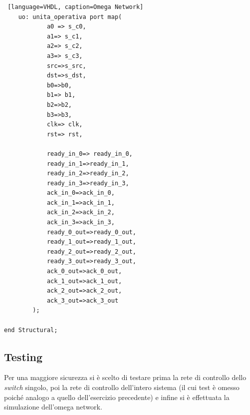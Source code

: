 \begin{lstlisting} [language=VHDL, caption=Omega Network]
    uo: unita_operativa port map(
            a0 => s_c0,
            a1=> s_c1,
            a2=> s_c2,
            a3=> s_c3,
            src=>s_src,
            dst=>s_dst,
            b0=>b0,
            b1=> b1,
            b2=>b2,
            b3=>b3,
            clk=> clk,
            rst=> rst,

            ready_in_0=> ready_in_0,
            ready_in_1=>ready_in_1,
            ready_in_2=>ready_in_2,
            ready_in_3=>ready_in_3,
            ack_in_0=>ack_in_0,
            ack_in_1=>ack_in_1,
            ack_in_2=>ack_in_2,
            ack_in_3=>ack_in_3,
            ready_0_out=>ready_0_out,
            ready_1_out=>ready_1_out,
            ready_2_out=>ready_2_out,
            ready_3_out=>ready_3_out,
            ack_0_out=>ack_0_out,
            ack_1_out=>ack_1_out,
            ack_2_out=>ack_2_out,
            ack_3_out=>ack_3_out
        );

end Structural;

\end{lstlisting}

\subsection{Testing}
Per una maggiore sicurezza si è scelto di testare prima la rete di controllo dello \textit{switch} singolo, poi la rete di controllo dell'intero sistema (il cui test è omesso poiché analogo a quello dell'esercizio precedente) e infine si è effettuata la simulazione dell'omega network.


